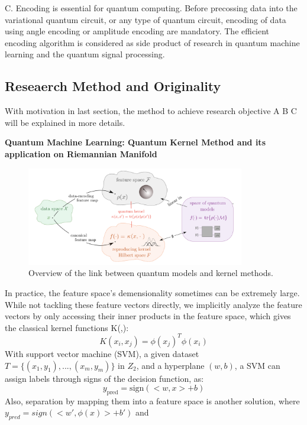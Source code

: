 \documentclass{article}
\begin{document}
C. Encoding is essential for quantum computing. Before precossing data 
into the variational quantum circuit, or any type of quantum circuit, 
encoding of data using angle encoding or amplitude encoding are mandatory. 
The efficient encoding algorithm is considered as side product of research 
in quantum machine learning and the quantum signal processing. 

\subsection{Reseaerch Method and Originality}
With motivation in last section, the method to achieve 
research objective A B C will be explained in more details. 

\textbf{Quantum Machine Learning: Quantum Kernel Method and its
application on Riemannian Manifold}
\begin{figure}[h]
  \begin{center}
    \includegraphics[width=0.85\textwidth]{kernel1.png}    
  \end{center}
  \caption{Overview of the link between quantum models 
  and kernel methods.}
\end{figure}
In practice, the feature space's demensionality 
sometimes can be extremely large. While not 
tackling these feature vectors directly, we 
implicitly analyze the feature vectors by 
only accessing their inner products in the 
feature space, which gives the classical kernel functions K(,):
\begin{equation}
  K(x_i, x_j) = \phi(x_j)^T \phi(x_i)
\end{equation}
With support vector machine (SVM), a given dataset 
$T = \{ (x_1, y_1), ..., (x_m, y_m)\}$ in $Z_2$, and 
a hyperplane $(w,b)$, a SVM can assign labels through
signs of the decision function, as:
\begin{equation}
  y_{\text{pred}} = \text{sign} ( <w,x> +b)
\end{equation}
Also, separation by mapping them into a feature space
is another solution, where $y_{pred} = sign( <w', \phi(x)> +b')$ and 
\end{document}
